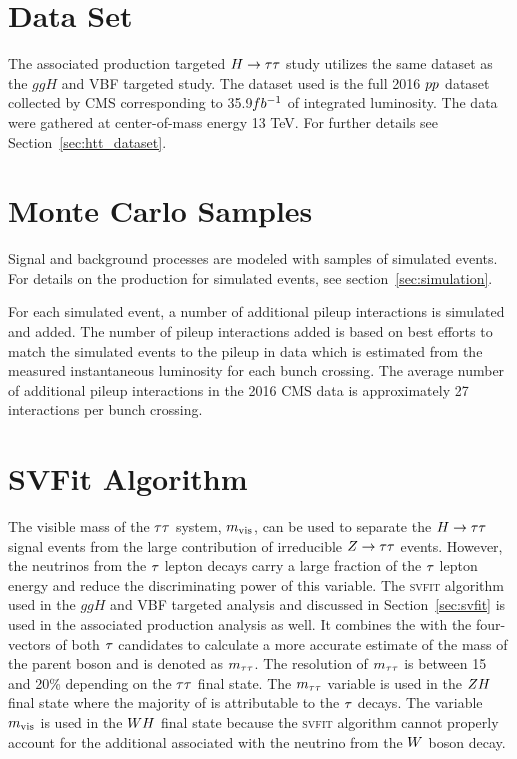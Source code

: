 \section{Data Set}
\label{sec:vh_dataset}
The associated production targeted $H\to\tau\tau$ study utilizes the same dataset as the
$ggH$ and VBF targeted study. The dataset used is the full 2016 $pp$ 
dataset collected by CMS corresponding to 35.9$fb^{-1}$ 
of integrated luminosity. The data were gathered at center-of-mass energy 13 TeV.
For further details see Section~\ref{sec:htt_dataset}.



\section{Monte Carlo Samples}
\label{sec:vh_mc_samples}
Signal and background processes are modeled with samples of simulated events.
For details on the production for simulated events, see section~\ref{sec:simulation}.

For each simulated event, a number of additional pileup interactions is simulated and added. 
The number of pileup interactions added is based on best efforts to match the simulated
events to the pileup in data which is estimated from the measured instantaneous
luminosity for each bunch crossing. The average number of additional pileup interactions in
the 2016 CMS data is approximately 27 interactions per bunch crossing.



\section{SVFit Algorithm}
The visible mass of the $\tau\tau$ system, $m_\text{vis}$, can be used to separate
the $H\to \tau \tau$ signal events
from the large contribution of irreducible $Z \to \tau \tau$ events.
However, the neutrinos from the $\tau$ lepton decays carry a large fraction of
the $\tau$ lepton energy and reduce the discriminating power of this variable.
The \textsc{svfit} algorithm used in the $ggH$ and VBF targeted analysis
and discussed in Section~\ref{sec:svfit} is used in the associated production
analysis as well. It combines the \etvecmiss 
with the four-vectors of both $\tau$ candidates to calculate a more accurate 
estimate of the mass of the parent boson and is denoted as $m_{\tau\tau}$. The resolution 
of $m_{\tau\tau}$ is between 15 and 20\% depending on the $\tau\tau$ final state. The 
$m_{\tau\tau}$ variable is used in the $ZH$ final state where the majority of 
\etvecmiss is attributable to the $\tau$ decays. The variable $m_\text{vis}$ is used in the 
$WH$ final state because the \textsc{svfit} algorithm cannot properly account for the 
additional \etvecmiss associated with the neutrino from the $W$ boson decay. 



